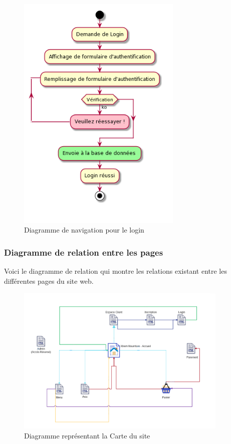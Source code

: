 \begin{figure}[H]
\begin{centering}
\includegraphics[width=0.7\textwidth,height=0.85\textheight]{Ressources/Login_navigation.png}
\caption{Diagramme de navigation pour le login}
\par
\end{centering}
\end{figure}

\clearpage

\subsubsection{Diagramme de relation entre les pages}
Voici le diagramme de relation qui montre les relations existant entre les différentes pages du site web.

\begin{figure}[H]
\begin{centering}
\includegraphics[width=0.9\textwidth,height=0.6\textheight]{Ressources/LaCarteDesSite.png}
\caption{Diagramme représentant la Carte du site}
\par
\end{centering}
\end{figure}

